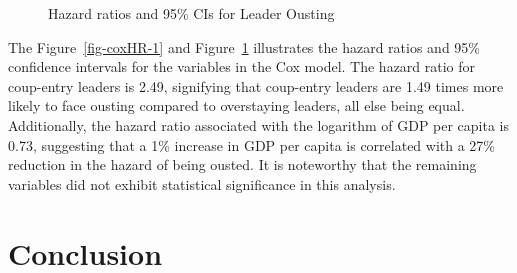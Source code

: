 \documentclass[
  12pt,
  a4paper,
  12pt]{article}
\begin{document}
\begin{figure}


\caption{\label{fig-coxHR-2}Hazard ratios and 95\% CIs for Leader
Ousting}

\end{figure}%

The Figure~\ref{fig-coxHR-1} and Figure~\ref{fig-coxHR-2} illustrates
the hazard ratios and 95\% confidence intervals for the variables in the
Cox model. The hazard ratio for coup-entry leaders is 2.49, signifying
that coup-entry leaders are 1.49 times more likely to face ousting
compared to overstaying leaders, all else being equal. Additionally, the
hazard ratio associated with the logarithm of GDP per capita is 0.73,
suggesting that a 1\% increase in GDP per capita is correlated with a
27\% reduction in the hazard of being ousted. It is noteworthy that the
remaining variables did not exhibit statistical significance in this
analysis.

\newpage

\section{Conclusion}\label{conclusion}

\newpage


\renewcommand\refname{References}
  
\end{document}
